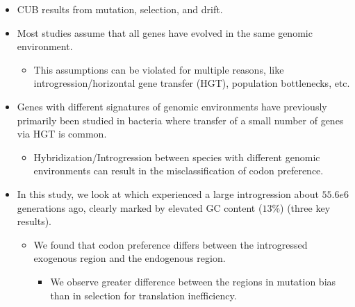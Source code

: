 \documentclass[12pt]{article}
\begin{document}
\begin{itemize}
	\item CUB results from mutation, selection, and drift.
	\item Most studies assume that all genes have evolved in the same genomic environment. %
	\begin{itemize}
		\item This assumptions can be violated for multiple reasons, like introgression/horizontal gene transfer (HGT), population bottlenecks, etc.
	\end{itemize}
	 \item Genes with different signatures of genomic environments have previously primarily been studied in bacteria where transfer of a small number of genes via HGT is common.
	\begin{itemize}
		\item Hybridization/Introgression between species with different genomic environments can result in the misclassification of codon preference.
	\end{itemize}
	\item In this study, we look at \kluyveri which experienced a large introgression about $55.6e6$ generations ago, clearly marked by elevated GC content ($13 \%$) (three key results).
	\begin{itemize}
		\item We found that codon preference differs between the introgressed exogenous region and the endogenous region.
		\begin{itemize}
			\item We observe greater difference between the regions in mutation bias than in selection for translation inefficiency.

\end{itemize}
\end{itemize}
\end{itemize}
\end{document}
